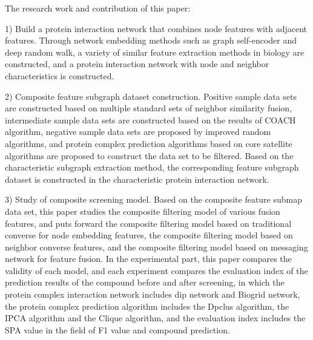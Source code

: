 \begin{eabstract}
  The research work and contribution of this paper:

  1) Build a protein interaction network that combines node features with adjacent features. Through network embedding methods such as graph self-encoder and deep random walk, a variety of similar feature extraction methods in biology are constructed, and a protein interaction network with node and neighbor characteristics is constructed.

  2) Composite feature subgraph dataset construction. Positive sample data sets are constructed based on multiple standard sets of neighbor similarity fusion, intermediate sample data sets are constructed based on the results of COACH algorithm, negative sample data sets are proposed by improved random algorithms, and protein complex prediction algorithms based on core satellite algorithms are proposed to construct the data set to be filtered. Based on the characteristic subgraph extraction method, the corresponding feature subgraph dataset is constructed in the characteristic protein interaction network.

  3) Study of composite screening model. Based on the composite feature submap data set, this paper studies the composite filtering model of various fusion features, and puts forward the composite filtering model based on traditional converse for node embedding features, the composite filtering model based on neighbor converse features, and the composite filtering model based on messaging network for feature fusion. In the experimental part, this paper compares the validity of each model, and each experiment compares the evaluation index of the prediction results of the compound before and after screening, in which the protein complex interaction network includes dip network and Biogrid network, the protein complex prediction algorithm includes the Dpclus algorithm, the IPCA algorithm and the Clique algorithm, and the evaluation index includes the SPA value in the field of F1 value and compound prediction.

\end{eabstract}

